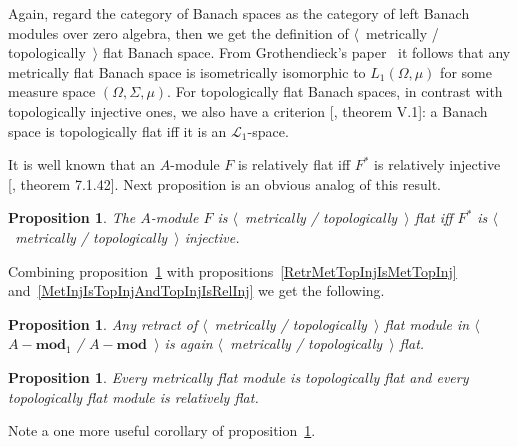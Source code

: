 \documentclass[12pt]{article}
\newtheorem{proposition}[theorem]{Proposition}
\begin{document}
Again, regard the category of Banach spaces as the category of left Banach
modules over zero algebra, then we get the definition of $\langle$~metrically /
topologically~$\rangle$ flat Banach space. From Grothendieck's
paper~\cite{GrothMetrProjFlatBanSp} it follows that any metrically flat Banach
space is isometrically isomorphic to $L_1(\Omega,\mu)$ for some measure space
$(\Omega,\Sigma,\mu)$. For topologically flat Banach spaces, in contrast with
topologically injective ones, we also have a criterion
    [\cite{StegRethNucOpL1LInfSp}, theorem V.1]: a Banach space is topologically
flat iff it is an $\mathscr{L}_1$-space.

It is well known that an $A$-module $F$ is relatively flat iff $F^*$ is
relatively injective [\cite{HelBanLocConvAlg}, theorem 7.1.42]. Next proposition
is an obvious analog of this result.

\begin{proposition}\label{MetTopFlatCharac} The $A$-module $F$ is
    $\langle$~metrically / topologically~$\rangle$ flat iff $F^*$ is
    $\langle$~metrically / topologically~$\rangle$ injective.
\end{proposition}

Combining proposition~\ref{MetTopFlatCharac} with
propositions~\ref{RetrMetTopInjIsMetTopInj}
and~\ref{MetInjIsTopInjAndTopInjIsRelInj} we get the following.

\begin{proposition}\label{RetrMetTopFlatIsMetTopFlat} Any retract of
    $\langle$~metrically / topologically~$\rangle$ flat module in
    $\langle$~$A-\mathbf{mod}_1$ / $A-\mathbf{mod}$~$\rangle$ is again $\langle$~metrically /
    topologically~$\rangle$ flat.
\end{proposition}

\begin{proposition}\label{MetFlatIsTopFlatAndTopFlatIsRelFlat} Every metrically
    flat module is topologically flat and every topologically flat module is
    relatively flat.
\end{proposition}

Note a one more useful corollary of proposition~\ref{MetTopFlatCharac}.
\end{document}
